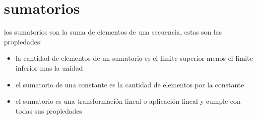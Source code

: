 \section{sumatorios}
los sumatorios son la suma de elementos de una secuencia, estas son las propiedades:
\begin{itemize}
\item la cantidad de elementos de un sumatorio es el limite superior menos el limite inferior mas la unidad
\item el sumatorio de una constante es la cantidad de elementos por la constante
\item el sumatorio es una transformación lineal o aplicación lineal y cumple con todas sus propiedades
\end{itemize}
